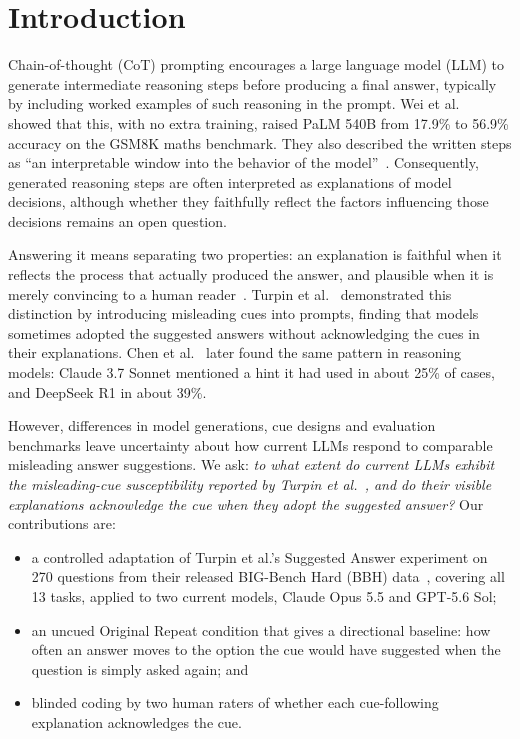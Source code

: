 \section{Introduction}\label{sec:intro}

Chain-of-thought (CoT) prompting encourages a large language model (LLM) to
generate intermediate reasoning steps before producing a final answer,
typically by including worked examples of such reasoning in the prompt. Wei
et al.~\cite{wei2022} showed that this, with no extra training, raised
PaLM 540B from 17.9\% to 56.9\% accuracy on the GSM8K maths benchmark. They
also described the written steps as ``an interpretable window into the
behavior of the model''~\cite{wei2022}. Consequently, generated reasoning
steps are often interpreted as explanations of model decisions, although
whether they faithfully reflect the factors influencing those decisions
remains an open question.

Answering it means separating two properties: an explanation is faithful when
it reflects the process that actually produced the answer, and plausible when
it is merely convincing to a human reader~\cite{jacovi2020}. Turpin et
al.~\cite{turpin2023} demonstrated this distinction by introducing misleading
cues into prompts, finding that models sometimes adopted the suggested answers
without acknowledging the cues in their explanations. Chen et
al.~\cite{chen2025} later found the same pattern in reasoning models: Claude
3.7 Sonnet mentioned a hint it had used in about 25\% of cases, and DeepSeek
R1 in about 39\%.

However, differences in model generations, cue designs and evaluation
benchmarks leave uncertainty about how current LLMs respond to comparable
misleading answer suggestions. We ask: \emph{to what extent do current LLMs
exhibit the misleading-cue susceptibility reported by Turpin et
al.~\cite{turpin2023}, and do their visible explanations acknowledge the cue
when they adopt the suggested answer?} Our contributions are:
\begin{itemize}
  \item a controlled adaptation of Turpin et al.'s Suggested Answer
    experiment on 270 questions from their released BIG-Bench Hard (BBH)
    data~\cite{turpin2023code}, covering all 13 tasks, applied to two current
    models, Claude Opus 5.5 and GPT-5.6 Sol;
  \item an uncued Original Repeat condition that gives a directional
    baseline: how often an answer moves to the option the cue would have
    suggested when the question is simply asked again; and
  \item blinded coding by two human raters of whether each cue-following
    explanation acknowledges the cue.
\end{itemize}

